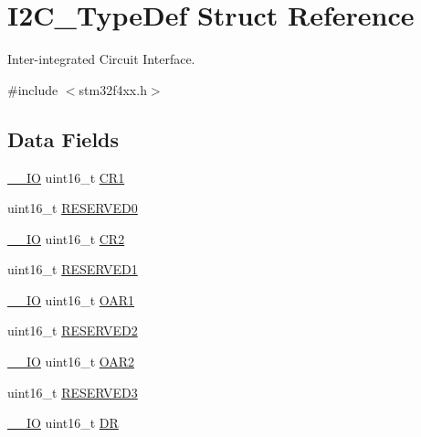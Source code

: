 \hypertarget{struct_i2_c___type_def}{\section{I2\-C\-\_\-\-Type\-Def Struct Reference}
\label{struct_i2_c___type_def}
}


Inter-\/integrated Circuit Interface.  




{\ttfamily \#include $<$stm32f4xx.\-h$>$}

\subsection*{Data Fields}
\begin{DoxyCompactItemize}
\item 
\hyperlink{group___c_m_s_i_s__core__definitions_gaec43007d9998a0a0e01faede4133d6be}{\-\_\-\-\_\-\-I\-O} uint16\-\_\-t \hyperlink{struct_i2_c___type_def_a61400ce239355b62aa25c95fcc18a5e1}{C\-R1}
\item 
uint16\-\_\-t \hyperlink{struct_i2_c___type_def_a149feba01f9c4a49570c6d88619f504f}{R\-E\-S\-E\-R\-V\-E\-D0}
\item 
\hyperlink{group___c_m_s_i_s__core__definitions_gaec43007d9998a0a0e01faede4133d6be}{\-\_\-\-\_\-\-I\-O} uint16\-\_\-t \hyperlink{struct_i2_c___type_def_a2a3e81bd118d1bc52d24a0b0772e6a0c}{C\-R2}
\item 
uint16\-\_\-t \hyperlink{struct_i2_c___type_def_a8249a3955aace28d92109b391311eb30}{R\-E\-S\-E\-R\-V\-E\-D1}
\item 
\hyperlink{group___c_m_s_i_s__core__definitions_gaec43007d9998a0a0e01faede4133d6be}{\-\_\-\-\_\-\-I\-O} uint16\-\_\-t \hyperlink{struct_i2_c___type_def_aaab934113da0a8bcacd1ffa148046569}{O\-A\-R1}
\item 
uint16\-\_\-t \hyperlink{struct_i2_c___type_def_a5573848497a716a9947fd87487709feb}{R\-E\-S\-E\-R\-V\-E\-D2}
\item 
\hyperlink{group___c_m_s_i_s__core__definitions_gaec43007d9998a0a0e01faede4133d6be}{\-\_\-\-\_\-\-I\-O} uint16\-\_\-t \hyperlink{struct_i2_c___type_def_a692c0f6e38cde9ec1c3c50c36aa79817}{O\-A\-R2}
\item 
uint16\-\_\-t \hyperlink{struct_i2_c___type_def_a6c3b31022e6f59b800e9f5cc2a89d54c}{R\-E\-S\-E\-R\-V\-E\-D3}
\item 
\hyperlink{group___c_m_s_i_s__core__definitions_gaec43007d9998a0a0e01faede4133d6be}{\-\_\-\-\_\-\-I\-O} uint16\-\_\-t \hyperlink{struct_i2_c___type_def_a0a1acc0425516ff7969709d118b96a3b}{D\-R}

\end{DoxyCompactItemize}
